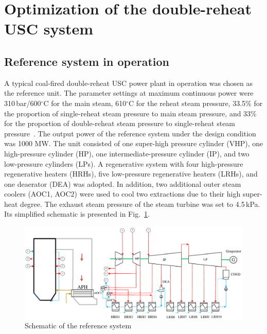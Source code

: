 \documentclass[preprint,12pt]{elsarticle}
\begin{document}
\section{Optimization of the double-reheat USC system}
\label{sec2:system intro}
\subsection{Reference system in operation}
\label{sub2:ref intro}
A typical coal-fired double-reheat USC power plant in operation was chosen as the reference unit.
The parameter settings at maximum continuous power were 310\,bar/600$^\circ$C for the main steam, 610$^\circ$C for the reheat steam pressure, 33.5\% for the proportion of single-reheat steam pressure to main steam pressure, and 33\% for the proportion of double-reheat steam pressure to single-reheat steam pressure~\cite{Zhao2017Exergy}.
The output power of the reference system under the design condition was 1000 MW.
The unit consisted of one super-high pressure cylinder (VHP), one high-pressure cylinder (HP), one intermediate-pressure cylinder (IP), and two low-pressure cylinders (LPs).
A regenerative system with four high-pressure regenerative heaters (HRHs), five low-pressure regenerative heaters (LRHs), and one deaerator (DEA) was adopted.
In addition, two additional outer steam coolers (AOC1, AOC2) were used to cool two extractions due to their high super-heat degree. The exhaust steam pressure of the steam turbine was set to 4.5\,kPa. Its simplified schematic is presented in Fig.~\ref{fig:reference_system}.

\begin{figure}[htbp]
\centering
\includegraphics[width=1\textwidth]{fig/reference_system}
\caption{Schematic of the reference system} 
\label{fig:reference_system}
\end{figure}
\end{document}
